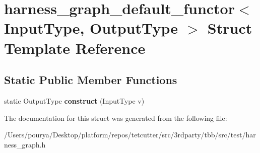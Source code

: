 \hypertarget{structharness__graph__default__functor}{}\section{harness\+\_\+graph\+\_\+default\+\_\+functor$<$ Input\+Type, Output\+Type $>$ Struct Template Reference}
\label{structharness__graph__default__functor}
\subsection*{Static Public Member Functions}
\begin{DoxyCompactItemize}
\item 
\hypertarget{structharness__graph__default__functor_a2d4d81137b4a567a664f930204c601c7}{}static Output\+Type {\bfseries construct} (Input\+Type v)\label{structharness__graph__default__functor_a2d4d81137b4a567a664f930204c601c7}

\end{DoxyCompactItemize}


The documentation for this struct was generated from the following file\+:\begin{DoxyCompactItemize}
\item 
/\+Users/pourya/\+Desktop/platform/repos/tetcutter/src/3rdparty/tbb/src/test/harness\+\_\+graph.\+h\end{DoxyCompactItemize}
